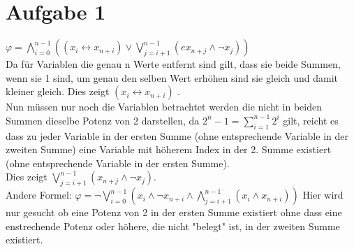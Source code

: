 \section*{Aufgabe 1}


$\varphi = \bigwedge_{i=0}^{n-1}((x_i \leftrightarrow x_{n+i}) \vee \bigvee_{j=i+1}^{n-1}( e x_{n+j} \wedge \neg x_{j}))$ \\



Da für Variablen die genau n Werte entfernt sind gilt, dass sie beide Summen, wenn sie 1 sind, um genau den selben Wert erhöhen sind sie gleich und damit kleiner gleich. Dies zeigt $(x_i \leftrightarrow x_{n+i})$ .\\


Nun müssen nur noch die Variablen betrachtet werden die nicht in beiden Summen dieselbe Potenz von 2 darstellen, da $2^n-1 = \sum_{i=1}^{n-1}2^i$ gilt, reicht es dass zu jeder Variable in der ersten Summe (ohne entsprechende Variable in der zweiten Summe)  eine Variable mit höherem Index in der 2. Summe  existiert (ohne entsprechende Variable in der ersten Summe).\\

Dies zeigt $ \bigvee_{j=i+1}^{n-1}( x_{n+j} \wedge \neg x_{j})$. \\



Andere Formel: $ \varphi = \neg \bigvee_{i=0}^{n-1}(x_i \wedge \neg x_{n+i} \wedge \bigwedge_{j=i+1}^{n-1} (x_i \wedge x_{n+i}))$ 
Hier wird nur gesucht ob eine Potenz von 2 in der ersten Summe existiert ohne dass eine enstrechende Potenz oder höhere, die nicht "belegt" ist, in der zweiten Summe existiert.